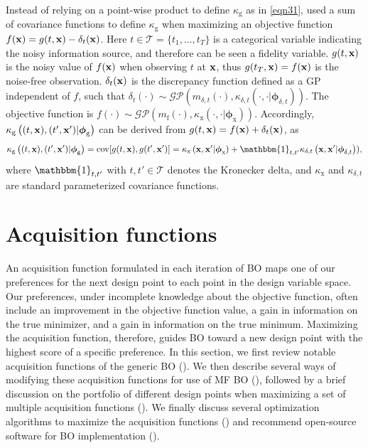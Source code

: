 \documentclass[journal ]{new-aiaa}
\begin{document}
Instead of relying on a point-wise product to define $\kappa_\text{g}$ as in \cref{eqn31}, \citet{Poloczek2017} used a sum of covariance functions to define $\kappa_\text{g}$ when maximizing an objective function $f({\bf x}) = g(t,{\bf x}) - \delta_t({\bf x})$.
Here $t \in \mathcal{T} = \{t_1,\dots,t_T\}$ is a categorical variable indicating the noisy information source, and therefore can be seen a fidelity variable.
$g(t,{\bf x})$ is the noisy value of $f({\bf x})$ when observing $t$ at ${\bf x}$, thus $g(t_T,{\bf x}) = f({\bf x})$ is the noise-free observation.
$\delta_t({\bf x})$ is the discrepancy function defined as a GP independent of $f$, such that $\delta_t(\cdot) \sim \mathcal{GP}(m_{\delta,t}(\cdot),\kappa_{\delta,t}\left(\cdot,\cdot|{\boldsymbol \phi}_{\delta,t}\right))$.
The objective function is $f(\cdot) \sim \mathcal{GP}(m_\text{f}(\cdot),\kappa_\text{x}\left(\cdot,\cdot|{\boldsymbol \phi}_\text{x}\right))$.
Accordingly, $\kappa_\text{g}\left((t,{\bf x}),(t',{\bf x}')|{\boldsymbol \phi}_\text{g}\right)$ can be derived from $g(t,{\bf x}) = f({\bf x}) + \delta_t({\bf x})$, as
\begin{equation}\label{eqn36}
	\kappa_\text{g}\left((t,{\bf x}),(t',{\bf x}')|{\boldsymbol \phi}_\text{g}\right) = \text{cov}[g(t,{\bf x}),g(t',{\bf x}')]
		=\kappa_\text{x}\left({\bf x},{\bf x}'|{\boldsymbol \phi}_\text{x}\right) +  \mathbbm{1}_{t,t'} \kappa_{\delta,t}\left({\bf x},{\bf x}'|{\boldsymbol \phi}_{\delta,t}\right)),
\end{equation}
where $\mathbbm{1}_{t,t'}$ with $t,t' \in \mathcal{T}$ denotes the Kronecker delta, and $\kappa_\text{x}$ and $\kappa_{\delta,t}$ are standard parameterized covariance functions.

\section{Acquisition functions}\label{Sec5}

An acquisition function formulated in each iteration of BO maps one of our preferences for the next design point to each point in the design variable space. 
Our preferences, under incomplete knowledge about the objective function, often include an improvement in the objective function value, a gain in information on the true minimizer, and a gain in information on the true minimum.
Maximizing the acquisition function, therefore, guides BO toward a new design point with the highest score of a specific preference.
In this section, we first review notable acquisition functions of the generic BO ().
We then describe several ways of modifying these acquisition functions for use of MF BO (), followed by a brief discussion on the portfolio of different design points when maximizing a set of multiple acquisition functions ().
We finally discuss several optimization algorithms to maximize the acquisition functions () and recommend open-source software for BO implementation ().
\end{document}
